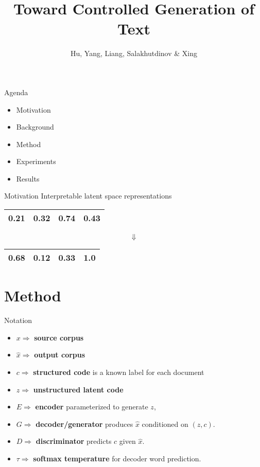 \documentclass{beamer}
\title{Toward Controlled Generation of Text}
\date{}
\author{Hu, Yang, Liang, Salakhutdinov \& Xing}
\institute{ICML 2017}
\begin{document}
  \maketitle

    \begin{frame}{Agenda}
      \begin{itemize}
      \item Motivation
      \item Background
      \item Method
      \item Experiments
      \item Results
      \end{itemize}
    \end{frame}

    \begin{frame}{Motivation}
      Interpretable latent space representations
      \begin{center}
        \begin{tabular}{ | c | c | c | c | }
          \hline
          0.21 & 0.32 & 0.74 & 0.43 \\  
          \hline
        \end{tabular}
      \end{center}
      {\Huge$$\Downarrow$$}
      \begin{center}
        \begin{tabular}{ | c | c | c | c | }
          \hline
          0.68 & 0.12 & 0.33 & {\color{red}\textbf{1.0}} \\  
          \hline
        \end{tabular}
      \end{center}
    \end{frame}

  \section{Method}
  \begin{frame}{Notation}
    \begin{itemize}
      \item $x \Rightarrow$ \textbf{source corpus}
      \item $\hat{x} \Rightarrow$ \textbf{output corpus}
      \item $c \Rightarrow$ \textbf{structured code} is a known label for each document
      \item $z \Rightarrow$ \textbf{unstructured latent code}
      \item $E \Rightarrow$ \textbf{encoder} parameterized to generate $z$, 
      \item $G \Rightarrow$ \textbf{decoder/generator} produces $\hat{x}$ conditioned on $(z, c)$.
      \item $D \Rightarrow$ \textbf{discriminator} predicts $c$ given $\hat{x}$.
      \item $\tau \Rightarrow$ \textbf{softmax temperature} for decoder word prediction.
    \end{itemize}
  \end{frame}
\end{document}
